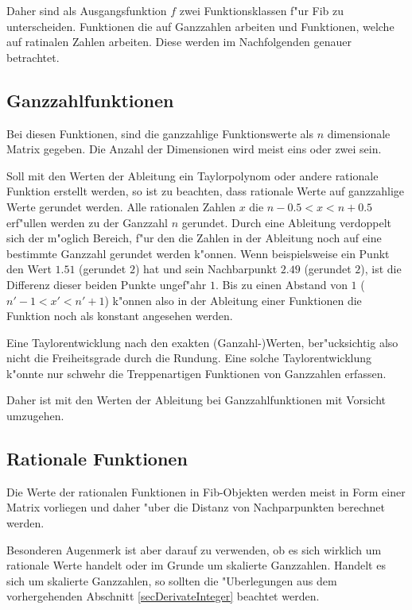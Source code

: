 Daher sind als Ausgangsfunktion $f$ zwei Funktionsklassen f"ur Fib zu unterscheiden. Funktionen die auf Ganzzahlen arbeiten und Funktionen, welche auf ratinalen Zahlen arbeiten.
Diese werden im Nachfolgenden genauer betrachtet.


\subsection{Ganzzahlfunktionen}
\label{secDerivateInteger}

Bei diesen Funktionen, sind die ganzzahlige Funktionswerte als $n$ dimensionale Matrix gegeben. Die Anzahl der Dimensionen wird meist eins oder zwei sein.

Soll mit den Werten der Ableitung ein Taylorpolynom oder andere rationale Funktion erstellt werden, so ist zu beachten, dass rationale Werte auf ganzzahlige Werte gerundet werden. Alle rationalen Zahlen $x$ die $n-0.5 < x < n+0.5$ erf"ullen werden zu der Ganzzahl $n$ gerundet. Durch eine Ableitung verdoppelt sich der m"oglich Bereich, f"ur den die Zahlen in der Ableitung noch auf eine bestimmte Ganzzahl gerundet werden k"onnen. Wenn beispielsweise ein Punkt den Wert $1.51$ (gerundet $2$) hat und sein Nachbarpunkt $2.49$ (gerundet $2$), ist die Differenz dieser beiden Punkte ungef"ahr $1$. Bis zu einen Abstand von $1$ ($n'-1 < x' < n'+1$) k"onnen also in der Ableitung einer Funktionen die Funktion noch als konstant angesehen werden.

Eine Taylorentwicklung nach den exakten (Ganzahl-)Werten, ber"ucksichtig also nicht die Freiheitsgrade durch die Rundung. Eine solche Taylorentwicklung k"onnte nur schwehr die Treppenartigen Funktionen von Ganzzahlen erfassen.

Daher ist mit den Werten der Ableitung bei Ganzzahlfunktionen mit Vorsicht umzugehen.


\subsection{Rationale Funktionen}

Die Werte der rationalen Funktionen in Fib-Objekten werden meist in Form einer Matrix vorliegen und daher "uber die Distanz von Nachparpunkten berechnet werden.

Besonderen Augenmerk ist aber darauf zu verwenden, ob es sich wirklich um rationale Werte handelt oder im Grunde um skalierte Ganzzahlen. Handelt es sich um skalierte Ganzzahlen, so sollten die "Uberlegungen aus dem vorhergehenden Abschnitt \ref{secDerivateInteger} beachtet werden.




